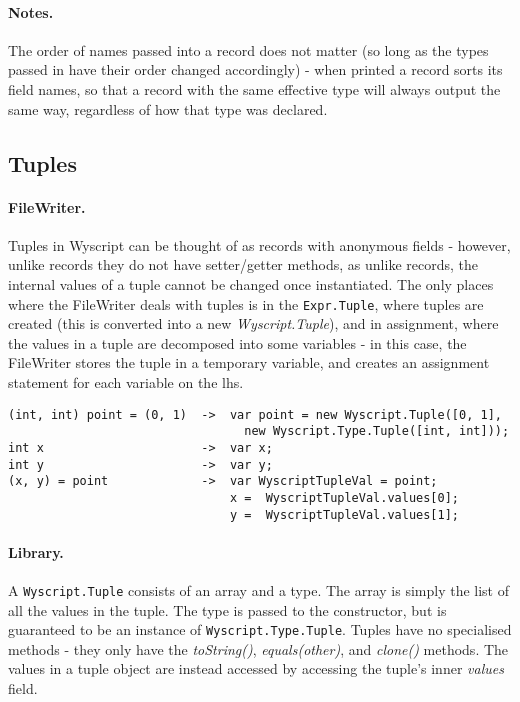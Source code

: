 \paragraph{Notes.} The order of names passed into a record does not matter (so long as the types passed in have their order changed accordingly) - when printed a record sorts its field names, so that a record with the same effective type will always output the same way, regardless of how that type was declared.


\subsection{Tuples}
\label{c_types_tuple}

\paragraph{FileWriter.} Tuples in Wyscript can be thought of as records with anonymous fields - however, unlike records they do not have setter/getter methods, as unlike records, the internal values of a tuple cannot be changed once
instantiated. The only places where the FileWriter deals with tuples is in the \lstinline{Expr.Tuple}, where tuples are created (this is converted into a new {\em Wyscript.Tuple}), and in assignment, where the values in a tuple are decomposed into some variables - in this case, the FileWriter stores the tuple in a temporary variable, and creates an assignment statement for each variable on the lhs.

\begin{lstlisting}
(int, int) point = (0, 1)  ->  var point = new Wyscript.Tuple([0, 1],
                                 new Wyscript.Type.Tuple([int, int]));
int x                      ->  var x;
int y                      ->  var y;
(x, y) = point             ->  var WyscriptTupleVal = point;
                               x =  WyscriptTupleVal.values[0];
                               y =  WyscriptTupleVal.values[1];
\end{lstlisting}

\paragraph{Library.} A \lstinline{Wyscript.Tuple} consists of an array and a type. The array is simply the list of all the values in the tuple. The type is passed to the constructor, but is guaranteed to be an instance of \lstinline{Wyscript.Type.Tuple}. Tuples have no specialised methods - they only have the {\em toString()}, {\em equals(other)}, and {\em clone()} methods. The values in a tuple object are instead accessed by accessing the tuple's
inner {\em values} field.

